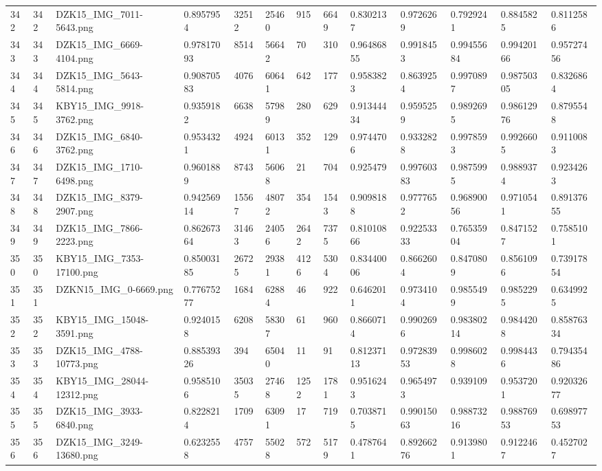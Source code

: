 \documentclass[11pt, a4paper, twoside]{report}
\begin{document}
\begin{longtable}[c]{@{}lllllllllllll@{}}
342 & 342 & DZK15\_IMG\_7011-5643.png & 0.8957954 & 32512 & 25460 & 915 & 6649 & 0.8302137 & 0.9726269 & 0.7929241 & 0.8845825 & 0.8112586 \\
343 & 343 & DZK15\_IMG\_6669-4104.png & 0.97817093 & 8514 & 56642 & 70 & 310 & 0.96486855 & 0.9918453 & 0.99455684 & 0.99420166 & 0.95727456 \\
344 & 344 & DZK15\_IMG\_5643-5814.png & 0.90870583 & 4076 & 60641 & 642 & 177 & 0.9583823 & 0.8639254 & 0.9970897 & 0.98750305 & 0.8326864 \\
345 & 345 & KBY15\_IMG\_9918-3762.png & 0.9359182 & 6638 & 57989 & 280 & 629 & 0.91344434 & 0.9595259 & 0.9892695 & 0.98612976 & 0.8795548 \\
346 & 346 & DZK15\_IMG\_6840-3762.png & 0.9534321 & 4924 & 60131 & 352 & 129 & 0.9744706 & 0.9332828 & 0.9978593 & 0.9926605 & 0.9110083 \\
347 & 347 & DZK15\_IMG\_1710-6498.png & 0.9601889 & 8743 & 56068 & 21 & 704 & 0.925479 & 0.99760383 & 0.9875995 & 0.9889374 & 0.9234263 \\
348 & 348 & DZK15\_IMG\_8379-2907.png & 0.94256914 & 15567 & 48072 & 354 & 1543 & 0.9098188 & 0.9777652 & 0.96890056 & 0.9710541 & 0.89137655 \\
349 & 349 & DZK15\_IMG\_7866-2223.png & 0.86267364 & 31463 & 24056 & 2642 & 7375 & 0.81010866 & 0.92253333 & 0.76535904 & 0.8471527 & 0.7585101 \\
350 & 350 & KBY15\_IMG\_7353-17100.png & 0.85003185 & 26725 & 29381 & 4126 & 5304 & 0.83440006 & 0.8662604 & 0.8470809 & 0.8561096 & 0.73917854 \\
351 & 351 & DZKN15\_IMG\_0-6669.png & 0.77675277 & 1684 & 62884 & 46 & 922 & 0.6462011 & 0.9734104 & 0.9855499 & 0.9852295 & 0.6349925 \\
352 & 352 & KBY15\_IMG\_15048-3591.png & 0.9240158 & 6208 & 58307 & 61 & 960 & 0.8660714 & 0.9902696 & 0.98380214 & 0.9844208 & 0.85876334 \\
353 & 353 & DZK15\_IMG\_4788-10773.png & 0.88539326 & 394 & 65040 & 11 & 91 & 0.81237113 & 0.97283953 & 0.9986028 & 0.9984436 & 0.79435486 \\
354 & 354 & KBY15\_IMG\_28044-12312.png & 0.9585106 & 35035 & 27468 & 1252 & 1781 & 0.9516243 & 0.9654973 & 0.939109 & 0.9537201 & 0.92032677 \\
355 & 355 & DZK15\_IMG\_3933-6840.png & 0.8228214 & 1709 & 63091 & 17 & 719 & 0.7038715 & 0.99015063 & 0.98873216 & 0.98876953 & 0.69897753 \\
356 & 356 & DZK15\_IMG\_3249-13680.png & 0.6232558 & 4757 & 55028 & 572 & 5179 & 0.4787641 & 0.89266276 & 0.9139801 & 0.9122467 & 0.4527027 \\

\end{longtable}
\end{document}
